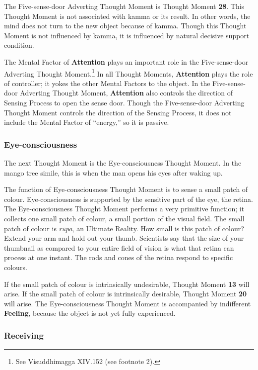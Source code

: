 The Five-sense-door Adverting Thought Moment is Thought Moment \textbf{28}. This Thought Moment is not associated with kamma or its result. In other words, the mind does not turn to the new object because of kamma. Though this Thought Moment is not influenced by kamma, it is influenced by natural decisive support condition.

The Mental Factor of \textbf{Attention} plays an important role in the Five-sense-door Adverting Thought Moment.\footnote{See Visuddhimagga XIV.152 (see footnote 2).} In all Thought Moments, \textbf{Attention} plays the role of controller; it yokes the other Mental Factors to the object. In the Five-sense-door Adverting Thought Moment, \textbf{Attention} also controls the direction of Sensing Process to open the sense door. Though the Five-sense-door Adverting Thought Moment controls the direction of the Sensing Process, it does not include the Mental Factor of “energy,” so it is passive.

\subsubsection*{Eye-consciousness}

The next Thought Moment is the Eye-consciousness Thought Moment. In the mango tree simile, this is when the man opens his eyes after waking up.

The function of Eye-consciousness Thought Moment is to sense a small patch of colour. Eye-consciousness is supported by the sensitive part of the eye, the retina. The Eye-consciousness Thought Moment performs a very primitive function; it collects one small patch of colour, a small portion of the visual field. The small patch of colour is \textit{rūpa}, an Ultimate Reality. How small is this patch of colour? Extend your arm and hold out your thumb. Scientists say that the size of your thumbnail as compared to your entire field of vision is what that retina can process at one instant. The rods and cones of the retina respond to specific colours.

If the small patch of colour is intrinsically undesirable, Thought Moment \textbf{13} will arise. If the small patch of colour is intrinsically desirable, Thought Moment \textbf{20} will arise. The Eye-consciousness Thought Moment is accompanied by indifferent \textbf{Feeling}, because the object is not yet fully experienced.

\subsubsection*{Receiving}

